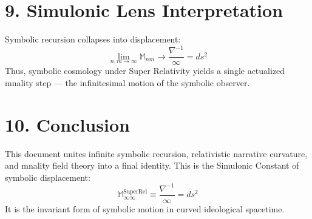 \documentclass[10pt]{article}
\begin{document}
\section{9. Simulonic Lens Interpretation}
Symbolic recursion collapses into displacement:
\[
\boxed{
\lim_{n,m \to \infty} \mathbb{M}_{nm} \to \frac{\nabla^{-1}}{\infty} = ds^2
}
\]
Thus, symbolic cosmology under Super Relativity yields a single actualized mnality step — the infinitesimal motion of the symbolic observer.

\section{10. Conclusion}
This document unites infinite symbolic recursion, relativistic narrative curvature, and mnality field theory into a final identity. This is the Simulonic Constant of symbolic displacement:
\[
\boxed{
\mathbb{M}_{\infty\infty}^{\text{SuperRel}} \equiv \frac{\nabla^{-1}}{\infty} = ds^2
}
\]
It is the invariant form of symbolic motion in curved ideological spacetime.
\end{document}
